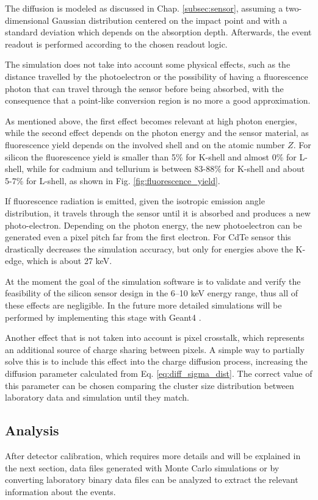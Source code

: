The diffusion is modeled as discussed in Chap. \ref{subsec:sensor}, assuming a two-dimensional Gaussian distribution centered on the impact point and with a standard deviation which depends on the absorption depth. Afterwards, the event readout is performed according to the chosen readout logic.

The simulation does not take into account some physical effects, such as the distance travelled by the photoelectron or the possibility of having a fluorescence photon that can travel through the sensor before being absorbed, with the consequence that a point-like conversion region is no more a good approximation.

As mentioned above, the first effect becomes relevant at high photon energies, while the second effect depends on the photon energy and the sensor material, as fluorescence yield depends on the involved shell and on the atomic number $Z$. For silicon the fluorescence yield is smaller than 5\% for K-shell and almost 0\% for L-shell, while for cadmium and tellurium is between 83-88\% for K-shell and about 5-7\% for L-shell, as shown in Fig. \ref{fig:fluorescence_yield}.

If fluorescence radiation is emitted, given the isotropic emission angle distribution, it travels through the sensor until it is absorbed and produces a new photo-electron. Depending on the photon energy, the new photoelectron can be generated even a pixel pitch far from the first electron. For CdTe sensor this drastically decreases the simulation accuracy, but only for energies above the K-edge, which is about 27 keV.

At the moment the goal of the simulation software is to validate and verify the feasibility of the silicon sensor design in the 6--10 keV energy range, thus all of these effects are negligible. In the future more detailed simulations will be performed by implementing this stage with Geant4 \cite{geant4}.

Another effect that is not taken into account is pixel crosstalk, which represents an additional source of charge sharing between pixels. A simple way to partially solve this is to include this effect into the charge diffusion process, increasing the diffusion parameter calculated from Eq. \ref{eq:diff_sigma_dist}. The correct value of this parameter can be chosen comparing the cluster size distribution between laboratory data and simulation until they match.

\subsection{Analysis}
\label{sec:analysis}
After detector calibration, which requires more details and will be explained in the next section, data files generated with Monte Carlo simulations or by converting laboratory binary data files can be analyzed to extract the relevant information about the events.

